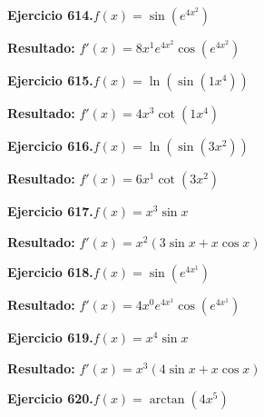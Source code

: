 \documentclass[10pt,a4paper]{article}
\begin{document}
\begin{ejbox}
\textbf{Ejercicio 614.}\quad $f(x) = \sin(e^{4x^{2}})$
\end{ejbox}

\begin{solbox}
\textbf{Resultado:} \(\displaystyle f'(x) = 8x^{1}e^{4x^{2}}\cos(e^{4x^{2}})\)
\end{solbox}

\begin{ejbox}
\textbf{Ejercicio 615.}\quad $f(x) = \ln(\sin(1x^{4}))$
\end{ejbox}

\begin{solbox}
\textbf{Resultado:} \(\displaystyle f'(x) = 4x^{3}\cot(1x^{4})\)
\end{solbox}

\newpage
\begin{ejbox}
\textbf{Ejercicio 616.}\quad $f(x) = \ln(\sin(3x^{2}))$
\end{ejbox}

\begin{solbox}
\textbf{Resultado:} \(\displaystyle f'(x) = 6x^{1}\cot(3x^{2})\)
\end{solbox}

\begin{ejbox}
\textbf{Ejercicio 617.}\quad $f(x) = x^{3} \sin x$
\end{ejbox}

\begin{solbox}
\textbf{Resultado:} \(\displaystyle f'(x) = x^{2}(3\sin x + x\cos x)\)
\end{solbox}

\begin{ejbox}
\textbf{Ejercicio 618.}\quad $f(x) = \sin(e^{4x^{1}})$
\end{ejbox}

\begin{solbox}
\textbf{Resultado:} \(\displaystyle f'(x) = 4x^{0}e^{4x^{1}}\cos(e^{4x^{1}})\)
\end{solbox}

\newpage
\begin{ejbox}
\textbf{Ejercicio 619.}\quad $f(x) = x^{4} \sin x$
\end{ejbox}

\begin{solbox}
\textbf{Resultado:} \(\displaystyle f'(x) = x^{3}(4\sin x + x\cos x)\)
\end{solbox}

\begin{ejbox}
\textbf{Ejercicio 620.}\quad $f(x) = \arctan(4x^{5})$
\end{ejbox}
\end{document}
